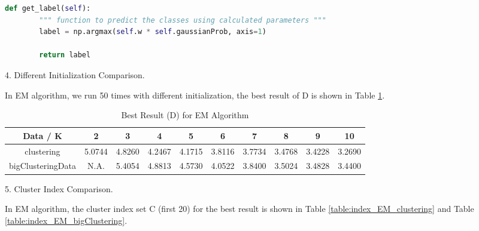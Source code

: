 \begin{description}
\begin{description}
\begin{lstlisting}[language=Python, caption=EM Algorithm Python Code]
    def get_label(self):
        """ function to predict the classes using calculated parameters """
        label = np.argmax(self.w * self.gaussianProb, axis=1)

        return label
\end{lstlisting}

\item{4.} Different Initialization Comparison.

In EM algorithm, we run 50 times with different initialization, the best result of D is shown in Table \ref{table:best_EM}.

\begin{table}[H]
	\centering
	\caption{Best Result (D) for EM Algorithm}
	\label{table:best_EM}	
	\begin{tabular}{ c | c | c | c | c | c | c | c | c | c}
		\hline \hline
		Data / K      & 2     &    3    & 4    & 5     & 6    & 7    & 8   & 9    & 10 \\[0.1cm]
		\hline
	clustering	        & 5.0744 &    4.8260 & 4.2467 & 4.1715 & 3.8116 & 3.7734 & 3.4768 & 3.4228 & 3.2690 \\[0.1cm]
bigClusteringData & N.A. &    5.4054 & 4.8813 & 4.5730 & 4.0522 & 3.8400 & 3.5024 & 3.4828 & 3.4400 \\[0.1cm]
		\hline	
	\end{tabular}
\end{table}

\item{5.} Cluster Index Comparison.

In EM algorithm, the cluster index set C (first 20) for the best result is shown in Table \ref{table:index_EM_clustering} and Table \ref{table:index_EM_bigClustering}.


\end{description}
\end{description}

